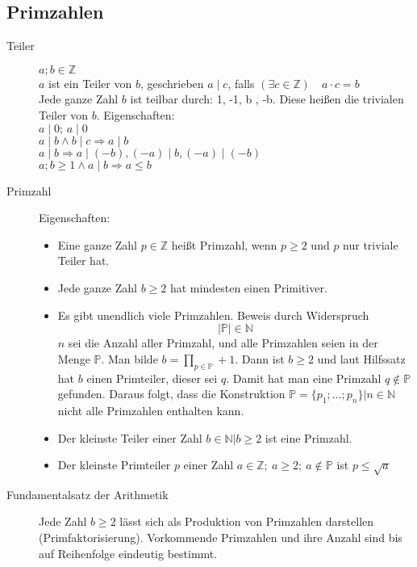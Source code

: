 \subsection{Primzahlen}
\begin{description}
    \item[Teiler] $a;b \in \mathbb{Z}$\\
    $a$ ist ein Teiler von $b$, geschrieben $a \mid c$, falls $(\exists c \in \mathbb{Z})\quad a \cdot c = b$\\
    Jede ganze Zahl $b$ ist teilbar durch: 1, -1, b , -b. Diese heißen die trivialen Teiler von $b$. Eigenschaften: \\
    $a \mid 0;\, a \mid 0$ \\
    $a \mid b \wedge b \mid c \Rightarrow a \mid b$ \\
    $a \mid b \Rightarrow a \mid (-b), (-a) \mid b, (-a) \mid (-b)$ \\
    $a;b \geq 1 \wedge a \mid b \Rightarrow a \leq b$
    \item[Primzahl] Eigenschaften:
    \begin{itemize}
        \item Eine ganze Zahl $p \in \mathbb{Z}$ heißt Primzahl, wenn $p \geq 2$ und $p$ nur triviale Teiler hat.
        \item Jede ganze Zahl $b \geq 2$ hat mindesten einen Primitiver.
        \item Es gibt unendlich viele Primzahlen. Beweis durch Widerspruch
        $$|\mathbb{P}| \in \mathbb{N}$$
        $n$ sei die Anzahl aller Primzahl, und alle Primzahlen seien in der Menge $\mathbb{P}$. Man bilde $b = \prod\limits_{p \in \mathbb{ P}} + 1$. Dann ist $b \geq 2$ und laut Hilfssatz hat $b$ einen Primteiler, dieser sei $q$. Damit hat man eine Primzahl $q \not \in \mathbb{P}$ gefunden. Daraus folgt, dass die Konstruktion $\mathbb{P} = \lbrace p_1; \dots; p_n \rbrace | n \in \mathbb{N}$ nicht alle Primzahlen enthalten kann.
        \item Der kleinste Teiler einer Zahl $b \in \mathbb{N}|b \geq 2$ ist eine Primzahl.
        \item Der kleinste Primteiler $p$ einer Zahl $a \in \mathbb{Z};\ a \geq 2;\ a \not \in \mathbb{P}$ ist $p \leq \sqrt{a}$
    \end{itemize}
    \item[Fundamentalsatz der Arithmetik] Jede Zahl $b \geq 2$ lässt sich als Produktion von Primzahlen darstellen (Primfaktorisierung). Vorkommende Primzahlen und ihre Anzahl sind bis auf Reihenfolge eindeutig bestimmt.
\end{description}
